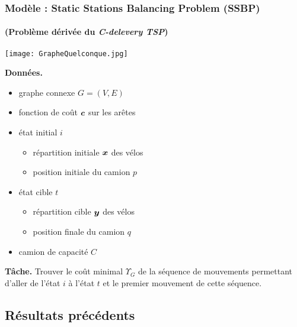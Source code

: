 \begin{frame}[label=Modele]
  \frametitle{Modèle : Static Stations Balancing Problem (SSBP)}
  \framesubtitle{(Problème dérivée du \emph{C-delevery TSP})}
  
  \begin{center}
  
    \begin{minipage}[c]{.5\linewidth}
      \begin{center}
        \texttt{[image: GrapheQuelconque.jpg]}
      \end{center}
    \end{minipage}\hfill
    \begin{minipage}[c]{.5\linewidth}
      \textbf{Données.}
      \begin{itemize}
      \item graphe connexe $G=(V,E)$
      \item fonction de coût $\boldsymbol{c}$ sur les arêtes
      \item état initial $i$
        \begin{itemize}
        \item répartition initiale $\boldsymbol{x}$ des vélos
        \item position initiale du camion $p$
        \end{itemize}
      \item état cible $t$
        \begin{itemize}
        \item répartition cible $\boldsymbol{y}$ des vélos
        \item position finale du camion $q$
        \end{itemize}
      \item camion de capacité $C$
      \end{itemize}
    \end{minipage}
    
  \end{center}

  \pause
  
  \vfill
  \textbf{Tâche.} Trouver le coût minimal $\Upsilon_G$ de la séquence de mouvements permettant d'aller de l'état $i$ à l'état $t$ et le premier mouvement de cette séquence.

\end{frame}

\subsection{Résultats précédents}

